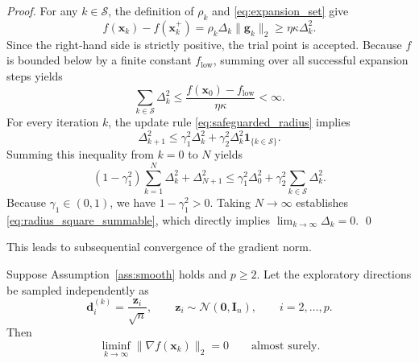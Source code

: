 \documentclass[smallextended]{svjour3}
\newcommand{\bx}{\bm{x}}
\newcommand{\bd}{\bm{d}}
\newcommand{\bg}{\bm{g}}
\newcommand{\bz}{\bm{z}}
\begin{document}
\begin{proof}
For any $k \in \mathcal S$, the definition of $\rho_k$ and \eqref{eq:expansion_set} give
\[
f(\bx_k)-f(\bx_k^+) = \rho_k\Delta_k\|\bg_k\|_2 \ge \eta\kappa\Delta_k^2.
\]
Since the right-hand side is strictly positive, the trial point is accepted. Because $f$ is bounded below by a finite constant $f_{\mathrm{low}}$, summing over all successful expansion steps yields
\[
\sum_{k\in\mathcal S}\Delta_k^2 \le \frac{f(\bx_0)-f_{\mathrm{low}}}{\eta\kappa} < \infty.
\]
For every iteration $k$, the update rule \eqref{eq:safeguarded_radius} implies
\[
\Delta_{k+1}^2 \le \gamma_1^2\Delta_k^2 + \gamma_2^2\Delta_k^2\mathbf{1}_{\{k\in\mathcal S\}}.
\]
Summing this inequality from $k=0$ to $N$ yields
\[
(1-\gamma_1^2) \sum_{k=1}^{N}\Delta_k^2 + \Delta_{N+1}^2 \le \gamma_1^2\Delta_0^2 + \gamma_2^2 \sum_{k\in\mathcal S}\Delta_k^2.
\]
Because $\gamma_1\in(0,1)$, we have $1-\gamma_1^2 > 0$. Taking $N\to\infty$ establishes \eqref{eq:radius_square_summable}, which directly implies $\lim_{k\to\infty}\Delta_k = 0$.
\qed
\end{proof}

This leads to subsequential convergence of the gradient norm.

\begin{theorem}
\label{thm:liminf_convergence}
Suppose Assumption~\ref{ass:smooth} holds and $p\ge2$. Let the exploratory directions be sampled independently as
\[
\bd_i^{(k)} = \frac{\bz_i}{\sqrt n}, \qquad \bz_i\sim\mathcal N(\bm0,\bm I_n), \qquad i=2,\ldots,p.
\]
Then
\begin{equation}
\label{eq:liminf_gradient}
\liminf_{k\to\infty} \|\nabla f(\bx_k)\|_2 = 0 \qquad \text{almost surely}.
\end{equation}
\end{theorem}
\end{document}
